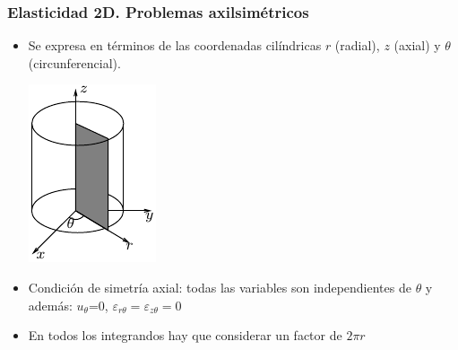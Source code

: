 \documentclass{beamer}
\begin{document}
\begin{frame}
\frametitle{Elasticidad 2D. Problemas axilsimétricos}
\begin{itemize}
\item Se expresa en términos de las coordenadas cilíndricas $r$ (radial),
$z$ (axial) y $\theta$ (circunferencial).

\includegraphics{axisim1}

\item Condición de simetría axial: todas las variables son independientes de 
$\theta$ y
además: $u_{\theta}$=0, $\varepsilon_{r \theta}=\varepsilon_{z \theta}=0$
\item En todos los integrandos hay que considerar un factor de $2 \pi r$
\end{itemize}
\end{frame}
\end{document}
